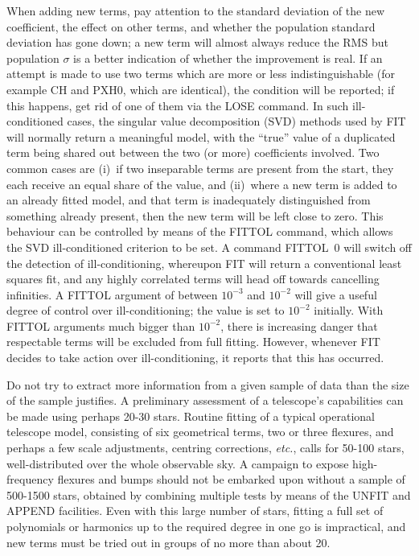 When adding new terms, pay attention to the standard deviation of
the new coefficient, the effect on other terms, and whether
the population standard deviation has gone down; a new term
will almost always reduce the RMS but population $\sigma$ is a better
indication of whether the improvement is real.  If an attempt
is made to use two terms which are more or less indistinguishable
(for example CH and PXH0, which are identical), the condition
will be reported;  if this happens, get rid of one of them
via the LOSE command.  In such ill-conditioned cases, the
singular value decomposition (SVD) methods used by FIT will normally
return a meaningful model, with the ``true'' value of a
duplicated term being shared out between the two (or more)
coefficients involved.  Two common cases are (i)~if two
inseparable terms are present from the start, they each receive
an equal share of the value, and (ii)~where a new term is added
to an already fitted model, and that term is inadequately
distinguished from something already present, then the new
term will be left close to zero.  This behaviour can be
controlled by means of the FITTOL command, which allows the
SVD ill-conditioned criterion to be set.  A command FITTOL~0 will switch
off the detection of ill-conditioning, whereupon FIT will return a
conventional least squares fit, and any highly correlated terms will
head off towards cancelling infinities.  A FITTOL argument
of between $10^{-3}$ and $10^{-2}$ will give a useful degree of control
over ill-conditioning;  the value is set to $10^{-2}$
initially.  With FITTOL arguments much bigger than
$10^{-2}$, there is increasing danger that respectable
terms will be excluded from full fitting.  However, whenever FIT
decides to take action over ill-conditioning, it reports that
this has occurred.

Do not try to extract more information from a given sample of
data than the size of the sample justifies.  A preliminary
assessment of a telescope's capabilities can be made using
perhaps 20-30 stars.  Routine fitting of a typical operational telescope
model, consisting of six geometrical terms, two or three
flexures, and perhaps a few scale adjustments, centring
corrections, {\it etc.}, calls for 50-100 stars, well-distributed over
the whole observable sky.
A campaign to expose high-frequency flexures
and bumps should not be embarked upon without a sample of 500-1500
stars, obtained by combining multiple tests by means of the UNFIT
and APPEND facilities.  Even with
this large number of stars, fitting a full set of polynomials or
harmonics up to the required degree in one go
is impractical, and new terms must be
tried out in groups of no more than about 20.

